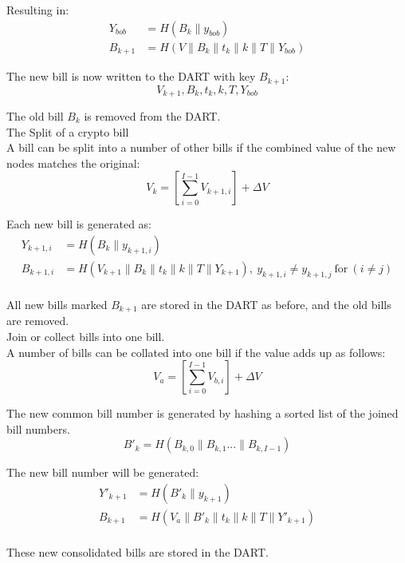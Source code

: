 Resulting in:
 \begin{align*}
 Y_{bob} & = H(B_k \parallel y_{bob} ) \\
 B_{k+1} & = H ( V \parallel B_k \parallel t_k \parallel k \parallel T \parallel Y_{bob} )
\end{align*}


The new bill is now written to the DART with key $B_{k+1}$:
\begin{equation*}
 V_{k+1}, B_k, t_k, k, T, Y_{bob} 
\end{equation*}


The old bill $B_k$  is removed from the DART. \\ 

The Split of a crypto bill \\
A bill can be split into a number of other bills if the combined value of the new nodes matches the original:
 \begin{equation}
  V_k = \left [ \sum_{i=0}^{I-1} {V_{k+1,i}} \right ] + {\Delta}V
 \end{equation}

Each new bill is generated as:
 \begin{align*}
 Y_{k+1,i} & = H ( B_k \parallel y_{k+1,i} ) \\
 B_{k+1,i} & = H ( V_{k+1} \parallel B_k \parallel t_k \parallel k \parallel T \parallel Y_{k+1} ), 
 ~ y_{k+1,i} \ne y_{k+1,j} ~ \text{for} ~ (i \ne j) \\
\end{align*}
 

All new bills marked $B_{k+1}$ are stored in the DART as before, and the old bills are removed. \\
Join or collect bills into one bill.\\
A number of bills can be collated into one bill if the value adds up as follows:
\begin{equation}
 V_a = \left[ \sum_{i=0}^{I-1} {V_{b,i}} \right] + {\Delta}V    
\end{equation}

The new common bill number is generated by hashing a sorted list of the joined bill numbers.  
\begin{equation}
 B'_k = H ( B_{k,0} \parallel B_{k,1} ... \parallel B_{k,I-1} )
\end{equation}

The new bill number will be generated: 
 \begin{align*}
  Y'_{k+1} & = H ( B'_k \parallel y_{k+1} ) \\
  B_{k+1} & = H ( V_a \parallel B'_k \parallel t_k \parallel k \parallel T \parallel Y'_{k+1} ) \\
 \end{align*}

These new consolidated bills are stored in the DART.
